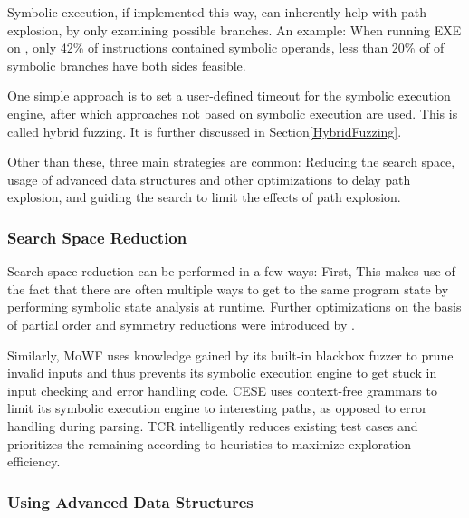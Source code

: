 \documentclass{article}
\begin{document}
\begin{multicols}{2}
  Symbolic execution, if implemented this way, can inherently help with path explosion, by only examining possible branches. An example: When running EXE\cite{EXE} on , only 42\% of instructions contained symbolic operands, less than 20\% of of symbolic branches have both sides feasible.\cite{EXE}

  One simple approach is to set a user-defined timeout for the symbolic execution engine, after which approaches not based on symbolic execution are used. This is called hybrid fuzzing\cite{HybridFuzzTesting}. It is further discussed in Section\ref{HybridFuzzing}.

  Other than these, three main strategies are common: Reducing the search space, usage of advanced data structures and other optimizations to delay path explosion, and guiding the search to limit the effects of path explosion.

  \subsubsection{Search Space Reduction}

  Search space reduction can be performed in a few ways: First, \cite{RWset} This makes use of the fact that there are often multiple ways to get to the same program state by performing symbolic state analysis at runtime. Further optimizations on the basis of partial order and symmetry reductions were introduced by \citeauthor{GSE}.\cite{GSE}

  Similarly, MoWF\cite{MoWF} uses knowledge gained by its built-in blackbox fuzzer to prune invalid inputs and thus prevents its symbolic execution engine to get stuck in input checking and error handling code. CESE\cite{CESE} uses context-free grammars to limit its symbolic execution engine to interesting paths, as opposed to error handling during parsing. TCR\cite{TCR} intelligently reduces existing test cases and prioritizes the remaining according to heuristics to maximize exploration efficiency.

  \subsubsection{Using Advanced Data Structures}


\end{multicols}
\end{document}
